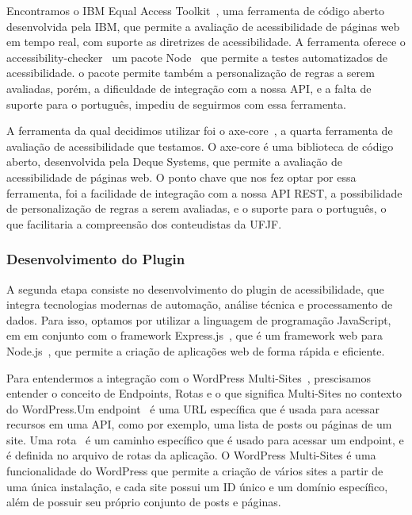 \documentclass[12pt]{article}
\begin{document}
Encontramos o IBM Equal Access Toolkit~\autocite{IBMa}, uma ferramenta de código 
aberto desenvolvida pela IBM, que permite a avaliação de acessibilidade de páginas
web em tempo real, com suporte as diretrizes de acessibilidade. A ferramenta oferece
o accessibility-checker~\autocite{AC} um pacote Node~\autocite{Node} que permite a testes automatizados de acessibilidade. o pacote permite também a personalização de regras a serem avaliadas,
porém, a dificuldade de integração com a nossa API, e a falta de suporte para o 
português, impediu de seguirmos com essa ferramenta.

A ferramenta da qual decidimos utilizar foi o axe-core~\autocite{axecore}, a quarta
ferramenta de avaliação de acessibilidade que testamos. O axe-core é uma biblioteca
de código aberto, desenvolvida pela Deque Systems, que permite a avaliação de acessibilidade
de páginas web. O ponto chave que nos fez optar por essa ferramenta, foi a facilidade
de integração com a nossa API REST, a possibilidade de personalização de regras a serem
avaliadas, e o suporte para o português, o que facilitaria a compreensão dos conteudistas
da UFJF\@.

\subsubsection{Desenvolvimento do Plugin}
A segunda etapa consiste no desenvolvimento do plugin de acessibilidade, que
integra tecnologias modernas de automação, análise técnica e processamento de
dados. Para isso, optamos por utilizar a linguagem de programação JavaScript, em
em conjunto com o framework Express.js~\autocite{express}, que é um framework web
para Node.js~\autocite{Node}, que permite a criação de aplicações web de forma rápida
e eficiente.

Para entendermos a integração com o WordPress Multi-Sites~\autocite{wp-ms}, prescisamos 
entender o conceito de Endpoints, Rotas e o que significa Multi-Sites no contexto do 
WordPress.Um endpoint~\autocite{endpoints} é uma URL específica que é usada para acessar 
recursos em uma API, como por exemplo, uma lista de posts ou páginas de um site. Uma 
rota~\autocite{routes} é um caminho específico que é usado para acessar um endpoint, 
e é definida no arquivo de rotas da aplicação. O WordPress Multi-Sites é uma funcionalidade
do WordPress que permite a criação de vários sites a partir de uma única instalação,
e cada site possui um ID único e um domínio específico, além de possuir seu próprio 
conjunto de posts e páginas.


\nocite{*}
\printbibliography[title={Referências}]
\end{document}
